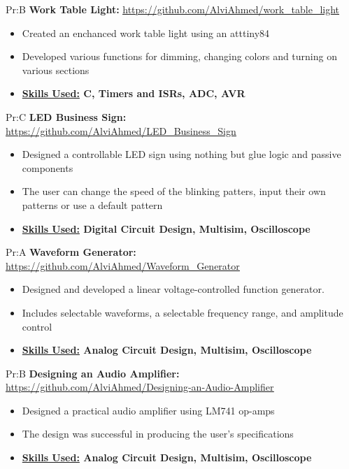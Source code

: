 Pr:B
\vspace{\spaces}
\textbf{Work Table Light: }
\underline{\url{https://github.com/AlviAhmed/work_table_light}}
\begin{itemize}[noitemsep,nolistsep]
\item Created an enchanced work table light using an atttiny84
\item Developed various functions for dimming, changing colors and turning on various sections 
\item \textbf{ \underline{Skills Used:} C, Timers and ISRs, ADC, AVR}
\end{itemize}


Pr:C
\vspace{\spaces}
\textbf{LED Business Sign: }
\underline{\url{https://github.com/AlviAhmed/LED_Business_Sign}}
\begin{itemize}[noitemsep,nolistsep]
\item Designed a controllable LED sign using nothing but glue logic and passive components
\item The user can change the speed of the blinking patters, input their own patterns or
  use a default pattern
\item \textbf{ \underline{Skills Used:} Digital Circuit Design, Multisim, Oscilloscope}
\end{itemize}


Pr:A
\vspace{\spaces}
\textbf{Waveform Generator: }
\underline{\url{https://github.com/AlviAhmed/Waveform_Generator}}
\begin{itemize}[noitemsep,nolistsep]
\item Designed and developed a linear voltage-controlled function generator. 
\item Includes selectable waveforms, a selectable frequency range, and amplitude control
\item \textbf{ \underline{Skills Used:} Analog Circuit Design, Multisim, Oscilloscope}
\end{itemize}            


Pr:B
\vspace{\spaces}
\textbf{Designing an Audio Amplifier: }
\underline{\url{https://github.com/AlviAhmed/Designing-an-Audio-Amplifier}}
\begin{itemize}[noitemsep,nolistsep]
\item Designed a practical audio amplifier using LM741 op-amps
\item The design was successful in producing the user's specifications
\item \textbf{ \underline{Skills Used:} Analog Circuit Design, Multisim, Oscilloscope}
\end{itemize}












